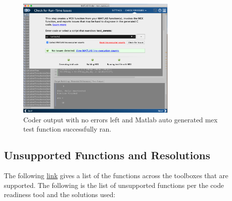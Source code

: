 \documentclass{article}
\begin{document}
\begin{figure}[H]
\centering
\includegraphics[trim={0 0 0 0},clip,width=0.7\textwidth]{../figs/coder_end.png}
\caption{Coder output with no errors left and Matlab auto generated mex test function successfully ran.}
\label{fig:coder_end}
\end{figure}

\subsection{Unsupported Functions and Resolutions}
The following \href{https://www.mathworks.com/help/simulink/ug/functions-and-objects-supported-for-cc-code-generation.html}{link} gives a list of the functions across the toolboxes that are supported.  The following is the list of unsupported functions per the code readiness tool and the solutions used:
\end{document}
